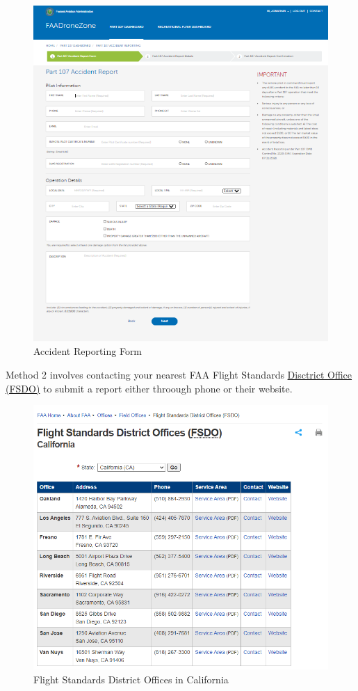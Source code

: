 \documentclass[
]{book}
\begin{document}
\begin{figure}
\centering
\includegraphics{images/DroneZone_Accident_Form.png}
\caption{Accident Reporting Form}
\end{figure}

Method 2 involves contacting your nearest FAA Flight Standards \href{https://www.faa.gov/about/office_org/field_offices/fsdo/}{Disctrict Office (FSDO)} to submit a report either throough phone or their website.

\begin{figure}
\centering
\includegraphics{images/FAA_California_FSDO.png}
\caption{Flight Standards District Offices in California}
\end{figure}
\end{document}
